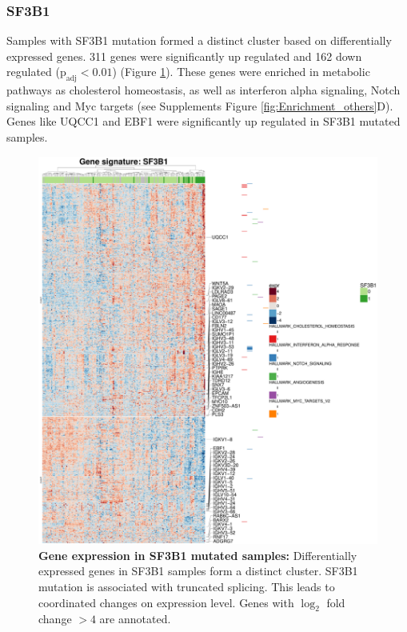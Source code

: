 \FloatBarrier


\subsubsection{SF3B1}
Samples with SF3B1 mutation formed a distinct cluster based on differentially expressed genes. 311 genes were significantly up regulated and 162 down regulated ($\text{p}_\text{adj} < 0.01$) (Figure \ref{fig:gene_exprSF3B1_gsea_kegg}). These genes were enriched in metabolic pathways as cholesterol homeostasis, as well as interferon alpha signaling, Notch signaling and Myc targets (see Supplements Figure \ref{fig:Enrichment_others}D). Genes like UQCC1 and EBF1 were significantly up regulated in SF3B1 mutated samples.

\FloatBarrier

\begin{figure}
	\centering
	\includegraphics[width=\columnwidth]{./Figures/gene_exprSF3B1_gsea_Hallmark.pdf}
	\caption{\textbf{Gene expression in SF3B1 mutated samples:} Differentially expressed genes in SF3B1 samples form a distinct cluster. SF3B1 mutation is associated with truncated splicing. This leads to coordinated changes on expression level. Genes with $\log_2$ fold change $>4$ are annotated. }
	\label{fig:gene_exprSF3B1_gsea_kegg}
\end{figure}

